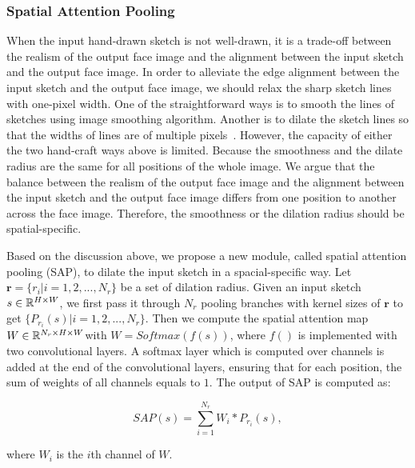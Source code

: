 \subsubsection{Spatial Attention Pooling}
When the input hand-drawn sketch is not well-drawn, it is a trade-off between the realism of the output face image and the alignment between the input sketch and the output face image.
%
In order to alleviate the edge alignment between the input sketch and the output face image, we should relax the sharp sketch lines with one-pixel width.
One of the straightforward ways is to smooth the lines of sketches using image smoothing algorithm. 
Another is to dilate the sketch lines so that the widths of lines are of multiple pixels~\cite{DeepSurgery}.
However, the capacity of either the two hand-craft ways above is limited. Because the smoothness and the dilate radius are the same for all positions of the whole image.
%
We argue that the balance between the realism of the output face image and the alignment between the input sketch and the output face image differs from one position to another across the face image. Therefore, the smoothness or the dilation radius should be spatial-specific. 

Based on the discussion above, we propose a new module, called spatial attention pooling (SAP), to dilate the input sketch in a spacial-specific way. Let $\mathbf{r}=\{r_i | i=1,2,...,N_r\}$ be a set of dilation radius. Given an input sketch $s\in {\mathbb{R}}^{H\times W}$, we first pass it through $N_r$ pooling branches with kernel sizes of $\mathbf{r}$ to get $\{P_{r_i}(s) | i=1,2,...,N_r\}$. Then we compute the spatial attention map $W\in {\mathbb{R}}^{N_r\times H\times W} $with $W = Softmax(f(s))$, where $f()$ is implemented with two convolutional layers. A softmax layer which is computed over channels is added at the end of the convolutional layers, ensuring that for each position, the sum of weights of all channels equals to $1$. The output of SAP is computed as:
	
\begin{equation}
	SAP(s)=\sum_{i=1}^{N_r} W_i * P_{r_i}(s),
\end{equation}

where $W_i$ is the $i$th channel of $W$.